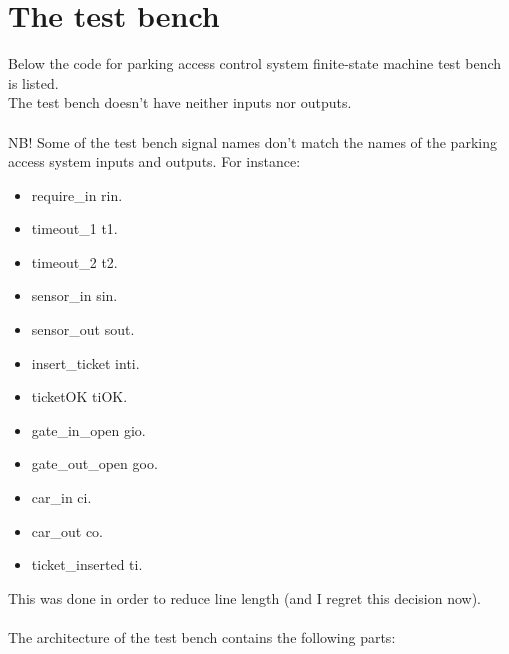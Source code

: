 \documentclass{article}
\begin{document}
	\section*{The test bench}
	Below the code for parking access control system finite-state machine test bench is listed. \\
	The test bench doesn't have neither inputs nor outputs. \\
	\ \\
	NB! Some of the test bench signal names don't match the names of the parking access system inputs and outputs. For instance:
	\begin{itemize}[nosep]
		\item require\_in \textrightarrow{} rin.
		\item timeout\_1 \textrightarrow{} t1.
		\item timeout\_2 \textrightarrow{} t2.
		\item sensor\_in \textrightarrow{} sin.
		\item sensor\_out \textrightarrow{} sout.
		\item insert\_ticket \textrightarrow{} inti.
		\item ticketOK \textrightarrow{} tiOK.
		\item gate\_in\_open \textrightarrow{} gio.
		\item gate\_out\_open \textrightarrow{} goo.
		\item car\_in \textrightarrow{} ci.
		\item car\_out \textrightarrow{} co.
		\item ticket\_inserted \textrightarrow{} ti.
	\end{itemize}
	This was done in order to reduce line length (and I regret this decision now). \\
	\ \\
	The architecture of the test bench contains the following parts:
\end{document}
